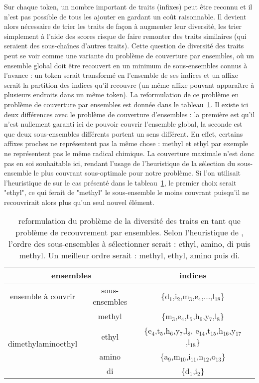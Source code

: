 \documentclass[PhD-Yoann-Dupont.tex]{subfiles}
\begin{document}
Sur chaque token, un nombre important de traits (infixes) peut être reconnu et il n'est pas possible de tous les ajouter en gardant un coût raisonnable. Il devient alors nécessaire de trier les traits de façon à augmenter leur diversité, les trier simplement à l'aide des scores risque de faire remonter des traits similaires (qui seraient des sous-chaînes d'autres traits). Cette question de diversité des traits peut se voir comme une variante du problème de couverture par ensembles, où un ensemble global doit être recouvert en un minimum de sous-ensembles connus à l'avance : un token serait transformé en l'ensemble de ses indices et un affixe serait la partition des indices qu'il recouvre (un même affixe pouvant apparaître à plusieurs endroits dans un même token). La reformulation de ce problème en problème de couverture par ensembles est donnée dans le tableau\ \ref{tab:substrings-as-covering}. Il existe ici deux différences avec le problème de couverture d'ensembles : la première est qu'il n'est nullement garanti ici de pouvoir couvrir l'ensemble global, la seconde est que deux sous-ensembles différents portent un sens différent. En effet, certains affixes proches ne représentent pas la même chose : methyl et ethyl par exemple ne représentent pas le même radical chimique. La couverture maximale n'est donc pas en soi souhaitable ici, rendant l'usage de l'heuristique de la sélection du sous-ensemble le plus couvrant \citep{chvatal1979greedy} sous-optimale pour notre problème. Si l'on utilisait l'heuristique de \citet{chvatal1979greedy} sur le cas présenté dans le tableau\ \ref{tab:substrings-as-covering}, le premier choix serait "ethyl", ce qui ferait de "methyl" le sous-ensemble le moins couvrant puisqu'il ne recouvrirait alors plus qu'un seul nouvel élément.

\begin{table}[ht!]
\centering
\begin{tabular}{|c|c|c|c|}
\hline
\multicolumn{2}{|c|}{ensembles}                      & indices\\
\hline
ensemble à couvrir                  & sous-ensembles & \{d$_{1}$,i$_{2}$,m$_{3}$,e$_{4}$,...,l$_{18}$\} \\
\hline
\multirow{4}{*}{dimethylaminoethyl} & methyl         & \{m$_{3}$,e$_{4}$,t$_{5}$,h$_{6}$,y$_{7}$,l$_{8}$\} \\
                                    & ethyl          & \{e$_{4}$,t$_{5}$,h$_{6}$,y$_{7}$,l$_{8}$, e$_{ 14}$,t$_{15}$,h$_{16}$,y$_{17}$,l$_{18}$\} \\
                                    & amino          & \{a$_{9}$,m$_{10}$,i$_{11}$,n$_{12}$,o$_{13}$\} \\
                                    & di             & \{d$_{1}$,i$_{2}$\} \\
\hline
\end{tabular}
\caption{reformulation du problème de la diversité des traits en tant que problème de recouvrement par ensembles. Selon l'heuristique de \citet{chvatal1979greedy}, l'ordre des sous-ensembles à sélectionner serait : ethyl, amino, di puis methyl. Un meilleur ordre serait : methyl, ethyl, amino puis di.}
\label{tab:substrings-as-covering}
\end{table}
\end{document}
